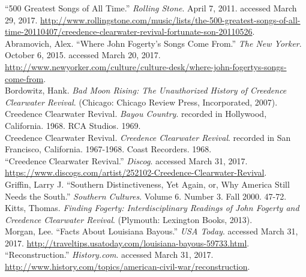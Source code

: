 \documentclass[10pt]{article}
\begin{document}
\begin{hangparas}{15pt}{1}
``500 Greatest Songs of All Time.'' \textit{Rolling Stone}. April 7, 2011. accessed March 29, 2017. \url{http://www.rollingstone.com/music/lists/the-500-greatest-songs-of-all-time-20110407/creedence-clearwater-revival-fortunate-son-20110526}. \\

Abramovich, Alex. ``Where John Fogerty's Songs Come From.'' \textit{The New Yorker}. October 6, 2015. accessed March 20, 2017. \url{http://www.newyorker.com/culture/culture-desk/where-john-fogertys-songs-come-from}. \\

Bordowitz, Hank. \textit{Bad Moon Rising: The Unauthorized History of Creedence Clearwater Revival}. (Chicago: Chicago Review Press, Incorporated, 2007). \\

Creedence Clearwater Revival. \textit{Bayou Country}. recorded in Hollywood, California. 1968. RCA Studios. 1969. \\

Creedence Clearwater Revival. \textit{Creedence Clearwater Revival}. recorded in San Francisco, California. 1967-1968. Coast Recorders. 1968. \\

``Creedence Clearwater Revival.'' \textit{Discog}. accessed March 31, 2017. \url{https://www.discogs.com/artist/252102-Creedence-Clearwater-Revival}. \\

Griffin, Larry J. ``Southern Distinctiveness, Yet Again, or, Why America Still Needs the South.'' \textit{Southern Cultures}. Volume 6. Number 3. Fall 2000. 47-72. \\

Kitts, Thomas. \textit{Finding Fogerty: Interdisciplinary Readings of John Fogerty and Creedence Clearwater Revival}. (Plymouth: Lexington Books, 2013). \\

Morgan, Lee. ``Facts About Louisiana Bayous.'' \textit{USA Today}. accessed March 31, 2017. \url{http://traveltips.usatoday.com/louisiana-bayous-59733.html}. \\

``Reconstruction.'' \textit{History.com}. accessed March 31, 2017. \url{http://www.history.com/topics/american-civil-war/reconstruction}. \\
\end{hangparas}
\end{document}
